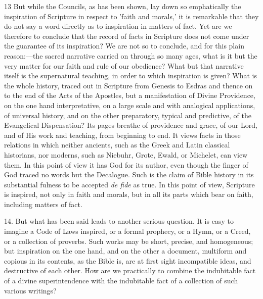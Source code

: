 13 But while the Councils, as has been shown, lay
down so emphatically the inspiration of Scripture in respect to 'faith
and morals,' it is remarkable that they do not say a word directly as
to inspiration in matters of fact. Yet are we therefore to conclude
that the record of facts in Scripture does not come under the
guarantee of its inspiration? We are not so to conclude, and for this
plain reason:—the sacred narrative carried on through so many ages,
what is it but the very matter for our faith and rule of our
obedience? What but that narrative itself is the supernatural
teaching, in order to which inspiration is given? What is the whole
history, traced out in Scripture from Genesis to Esdras and thence on
to the end of the Acts of the Apostles, but a manifestation of Divine
Providence, on the one hand interpretative, on a large scale and with
analogical applications, of universal history, and on the other
preparatory, typical and predictive, of the Evangelical Dispensation?
Its pages breathe of providence and grace, of our Lord, and of His
work and teaching, from beginning to end. It views facts in those
relations in which neither ancients, such as the Greek and Latin
classical historians, nor moderns, such as Niebuhr, Grote, Ewald, or
Michelet, can view them. In this point of view it has God for its
author, even though the finger of God traced no words but the
Decalogue. Such is the claim of Bible history in its substantial
fulness to be accepted \emph{de fide} as true. In this point of view,
Scripture is inspired, not only in faith and morals, but in all its
parts which bear on faith, including matters of fact.

14. But what has been said leads to another
serious question. It is easy to imagine a Code of Laws inspired, or a
formal prophecy, or a Hymn, or a Creed, or a collection of proverbs.
Such works may be short, precise, and homogeneous; but inspiration on
the one hand, and on the other a document, multiform and copious in
its contents, as the Bible is, are at first sight incompatible ideas,
and destructive of each other. How are we practically to combine the
indubitable fact of a divine superintendence with the indubitable fact
of a collection of such various writings?

